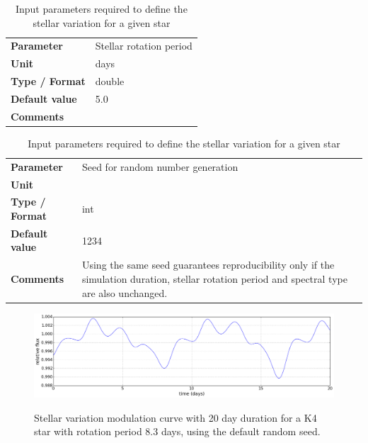 \documentclass[11pt]{article}      %
\def\HCode#1{}
\def\htmlanchor#1{\HCode{<a id="#1"></a>}}
\begin{document}
\begin{table}[hb]
  \caption{Input parameters required to define the stellar variation for a given star}

  \htmlanchor{rotationPeriod}
  \begin{tabular}{| l | p{13cm} |}
    \hline 
    {\bf Parameter} & Stellar rotation period\\
    {\bf Unit} & days\\
    {\bf Type / Format} & double\\
    {\bf Default value} & 5.0\\
    {\bf Comments} & \\
    \hline
  \end{tabular}
  \bigskip

  \htmlanchor{stellarVariationSeed}
  \begin{tabular}{| l | p{13cm} |}
    \hline 
    {\bf Parameter} & Seed for random number generation\\
    {\bf Unit} & \\
    {\bf Type / Format} & int\\
    {\bf Default value} & 1234\\
    {\bf Comments} & Using the same seed guarantees reproducibility only if the simulation duration, stellar rotation period and spectral type are also unchanged.\\
    \hline
  \end{tabular}
  \bigskip

  \label{tab:variation}
\end{table}

\begin{figure}[hbtp]
  \begin{center}
    {\includegraphics[width=\textwidth]{stellar_variation1.png}}
    \caption{Stellar variation modulation curve with 20 day duration for a K4 star with rotation period 8.3 days, using the default random seed.}
    \label{fig:variation1}
  \end{center}
\end{figure}
\end{document}
